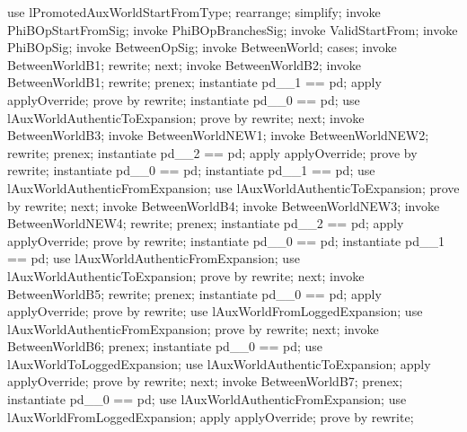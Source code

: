 \begin{LPScript}\begin{zproof}[lPromotedBetweenWorldStartFromType]
    use lPromotedAuxWorldStartFromType;
    rearrange;
    simplify;
    invoke PhiBOpStartFromSig;
    invoke PhiBOpBranchesSig;
    invoke ValidStartFrom;
    invoke PhiBOpSig;
    invoke BetweenOpSig;
    invoke BetweenWorld;
    cases;
        invoke BetweenWorldB1;
        rewrite;
    next;
        invoke BetweenWorldB2;
        invoke BetweenWorldB1;
        rewrite;
        prenex;
        instantiate pd\_\_1 == pd;
        apply applyOverride;
        prove by rewrite;
        instantiate pd\_\_0 == pd;
        use lAuxWorldAuthenticToExpansion;
        prove by rewrite;
    next;
        invoke BetweenWorldB3;
        invoke BetweenWorldNEW1;
        invoke BetweenWorldNEW2;
        rewrite;
        prenex;
        instantiate pd\_\_2 == pd;
        apply applyOverride;
        prove by rewrite;
        instantiate pd\_\_0 == pd;
        instantiate pd\_\_1 == pd;
        use lAuxWorldAuthenticFromExpansion;
        use lAuxWorldAuthenticToExpansion;
        prove by rewrite;
    next;
        invoke BetweenWorldB4;
        invoke BetweenWorldNEW3;
        invoke BetweenWorldNEW4;
        rewrite;
        prenex;
        instantiate pd\_\_2 == pd;
        apply applyOverride;
        prove by rewrite;
        instantiate pd\_\_0 == pd;
        instantiate pd\_\_1 == pd;
        use lAuxWorldAuthenticFromExpansion;
        use lAuxWorldAuthenticToExpansion;
        prove by rewrite;
    next;
        invoke BetweenWorldB5;
        rewrite;
        prenex;
        instantiate pd\_\_0 == pd;
        apply applyOverride;
        prove by rewrite;
        use lAuxWorldFromLoggedExpansion;
        use lAuxWorldAuthenticFromExpansion;
        prove by rewrite;
    next;
        invoke BetweenWorldB6;
        prenex;
        instantiate pd\_\_0 == pd;
        use lAuxWorldToLoggedExpansion;
        use lAuxWorldAuthenticToExpansion;
        apply applyOverride;
        prove by rewrite;
    next;
        invoke BetweenWorldB7;
        prenex;
        instantiate pd\_\_0 == pd;
        use lAuxWorldAuthenticFromExpansion;
        use lAuxWorldFromLoggedExpansion;
        apply applyOverride;
        prove by rewrite;

\end{zproof}
\end{LPScript}
